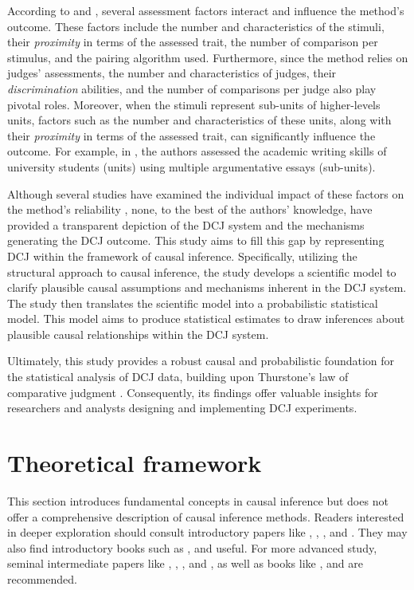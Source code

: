 \documentclass[
  authoryear,
  preprint,
  1p]{elsarticle}
\begin{document}
According to \citet{Verhavert_et_al_2019} and \citet{vanDaal_2020},
several assessment factors interact and influence the method's outcome.
These factors include the number and characteristics of the stimuli,
their \emph{proximity} in terms of the assessed trait, the number of
comparison per stimulus, and the pairing algorithm used. Furthermore,
since the method relies on judges' assessments, the number and
characteristics of judges, their \emph{discrimination} abilities, and
the number of comparisons per judge also play pivotal roles. Moreover,
when the stimuli represent sub-units of higher-levels units, factors
such as the number and characteristics of these units, along with their
\emph{proximity} in terms of the assessed trait, can significantly
influence the outcome. For example, in \citet{vanDaal_et_al_2016}, the
authors assessed the academic writing skills of university students
(units) using multiple argumentative essays (sub-units).

Although several studies have examined the individual impact of these
factors on the method's reliability
\citep{Bramley_2015, Pollitt_2012b, Bramley_et_al_2019, Verhavert_et_al_2019, Crompvoets_et_al_2022, vanDaal_et_al_2017, Gijsen_et_al_2021, Bouwer_et_al_2023},
none, to the best of the authors' knowledge, have provided a transparent
depiction of the DCJ system and the mechanisms generating the DCJ
outcome. This study aims to fill this gap by representing DCJ within the
framework of causal inference. Specifically, utilizing the structural
approach to causal inference, the study develops a scientific model to
clarify plausible causal assumptions and mechanisms inherent in the DCJ
system. The study then translates the scientific model into a
probabilistic statistical model. This model aims to produce statistical
estimates to draw inferences about plausible causal relationships within
the DCJ system.

Ultimately, this study provides a robust causal and probabilistic
foundation for the statistical analysis of DCJ data, building upon
Thurstone's law of comparative judgment \citeyearpar{Thurstone_1927}.
Consequently, its findings offer valuable insights for researchers and
analysts designing and implementing DCJ experiments.

\section{Theoretical framework}\label{sec-framework}

This section introduces fundamental concepts in causal inference but
does not offer a comprehensive description of causal inference methods.
Readers interested in deeper exploration should consult introductory
papers like \citet{Pearl_2010}, \citet{Rohrer_2018}, \citet{Pearl_2019},
and \citet{Cinelli_et_al_2020}. They may also find introductory books
such as \citet{Pearl_et_al_2018}, \citet{Neal_2020} and
\citet{McElreath_2020} useful. For more advanced study, seminal
intermediate papers like \citet{Neyman_et_al_1923}, \citet{Rubin_1974},
\citet{Spirtes_et_al_1991}, and \citet{Sekhon_2009}, as well as books
like \citet{Pearl_2009}, \citet{Morgan_et_al_2014} and
\citet{Hernan_et_al_2020} are recommended.
\end{document}
